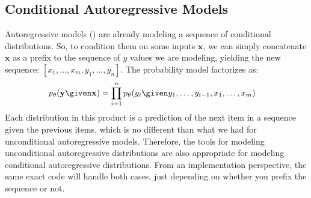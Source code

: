 
\subsection{Conditional Autoregressive Models} 
Autoregressive models (\sect{\ref{sec:generative_models:autoregressive}}) are already modeling a sequence of conditional distributions. So, to condition them on some inputs $\mathbf{x}$, we can simply concatenate $\mathbf{x}$ as a prefix to the sequence of $y$ values we are modeling, yielding the new sequence: $[x_1, \ldots, x_m, y_1, \ldots, y_n]$. The probability model factorizes as:
\begin{align}
    p_{\theta}(\mathbf{y} \given \mathbf{x}) &= \prod_{i=1}^n p_{\theta}(y_i \given y_1, \ldots, y_{i-1}, x_1, \ldots, x_m)
\end{align}
Each distribution in this product is a prediction of the next item in a sequence given the previous items, which is no different than what we had for unconditional autoregressive models. Therefore, the tools for modeling unconditional autoregressive distributions are also appropriate for modeling conditional autoregressive distributions. From an implementation perspective, the same exact code will handle both cases, just depending on whether you prefix the sequence or not. %


